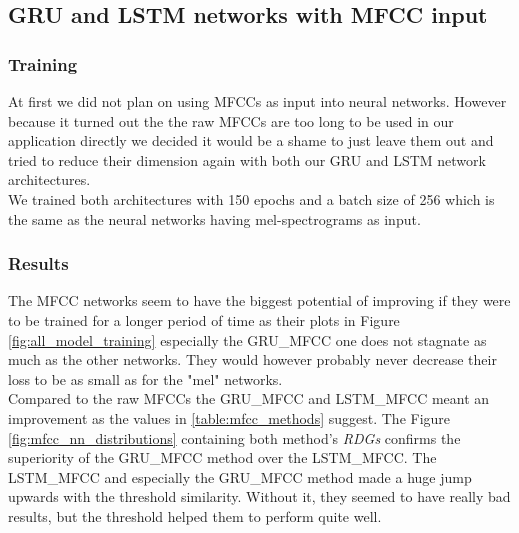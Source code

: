 \subsection{GRU and LSTM networks with MFCC input}

\subsubsection{Training}
At first we did not plan on using MFCCs as input into neural networks. However because it turned out the the raw MFCCs are too long to be used in our application directly we decided it would be a shame to just leave them out and tried to reduce their dimension again with both our GRU and LSTM network architectures. \\ 
We trained both architectures with 150 epochs and a batch size of 256 which is the same as the neural networks having mel-spectrograms as input. 

\subsubsection{Results}

The MFCC networks seem to have the biggest potential of improving if they were to be trained for a longer period of time as their plots in Figure \ref{fig:all_model_training} especially the GRU\_MFCC one does not stagnate as much as the other networks. They would however probably never decrease their loss to be as small as for the "mel" networks. \\
Compared to the raw MFCCs the GRU\_MFCC and LSTM\_MFCC meant an improvement as the values in \ref{table:mfcc_methods} suggest. The Figure \ref{fig:mfcc_nn_distributions} containing both method's \textit{RDGs} confirms the superiority of the GRU\_MFCC method over the LSTM\_MFCC. The LSTM\_MFCC and especially the GRU\_MFCC method made a huge jump upwards with the threshold similarity. Without it, they seemed to have really bad results, but the threshold helped them to perform quite well.

